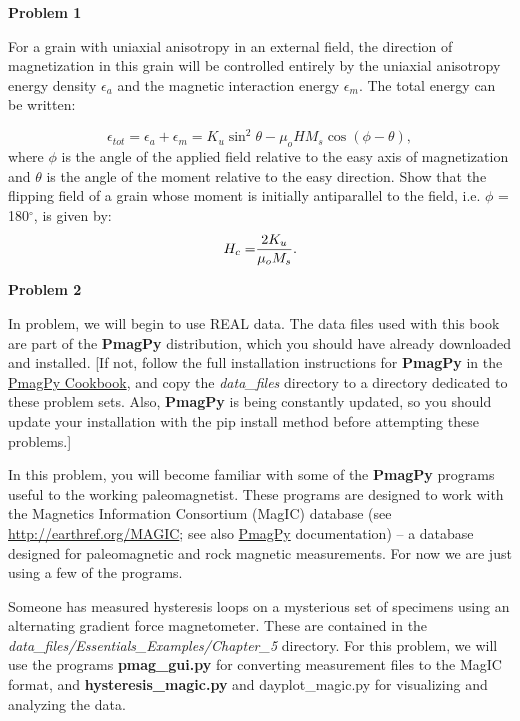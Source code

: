 {\parindent 0pt \parskip 12pt 


{\bf Problem 1}

For a grain with uniaxial anisotropy in an external field, the direction of magnetization in this grain will be controlled entirely by the uniaxial anisotropy energy density  $\epsilon_a$ and the magnetic interaction energy $\epsilon_m$.  The total energy can be written:

$$
\epsilon_{tot} = \epsilon_a + \epsilon_m = K_u \sin^2 \theta - \mu_o H M_s \cos (\phi -\theta),
$$
\noindent where $\phi$ is the angle of the applied field relative to the easy axis of magnetization and $\theta$ is the angle of the moment relative to the easy direction.  Show that the flipping field of  a grain whose moment is initially antiparallel to the field, i.e. $\phi$ = 180$^{\circ}$,  is given by:
$$
{H_c =} { {2K_u}\over {\mu_o M_s}}.
$$


%

{\bf Problem 2}


In problem, we will begin to use REAL data.  The data files used with this book are part of the {\bf PmagPy} distribution, which you should have already downloaded and installed.  [If not, follow the full installation instructions for {\bf PmagPy} in the \href{http://earthref.org/PmagPy/}{PmagPy Cookbook}, and copy the {\it data\_files} directory to a directory dedicated to these problem sets. Also, {\bf PmagPy} is being constantly updated, so you should update your installation with the pip install method before attempting these problems.]  

In this problem, you will become familiar with  some of the {\bf PmagPy}  programs  useful to the working paleomagnetist.   These programs are designed to work with the Magnetics Information Consortium (MagIC)  database (see \url{http://earthref.org/MAGIC}; see also  \href{http://earthref.org/PmagPy/cookbook}{PmagPy} documentation) -- a database designed for paleomagnetic and rock magnetic measurements.  For now we are just using a few of the  programs.   

  Someone has measured  hysteresis loops  on a mysterious set of specimens using an alternating gradient force magnetometer.     These are contained in the {\it data\_files/Essentials\_Examples/Chapter\_5}  directory.    For this problem, we will use the programs {\bf pmag\_gui.py} for converting measurement files to the MagIC format, and  {\bf hysteresis\_magic.py} and {dayplot\_magic.py} for visualizing and analyzing the data.  

}
